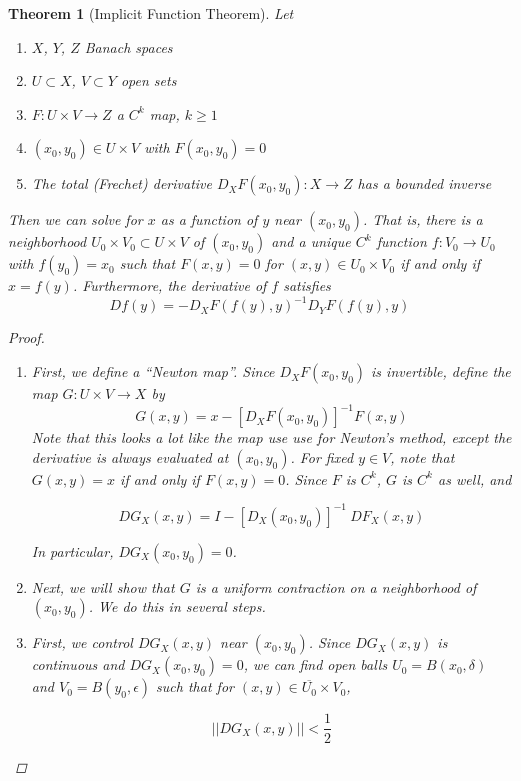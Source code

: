 \documentclass{article}
\newtheorem{theorem}{Theorem}[section]
\begin{document}
\begin{theorem}[Implicit Function Theorem]
Let
\begin{enumerate}
\item $X$, $Y$, $Z$ Banach spaces
\item $U \subset X$, $V \subset Y$ open sets
\item $F: U \times V \rightarrow Z$ a $C^k$ map, $k \geq 1$
\item $(x_0, y_0) \in U \times V$ with $F(x_0, y_0) = 0$
\item The total (Frechet) derivative $D_X F(x_0, y_0): X \rightarrow Z$ has a bounded inverse
\end{enumerate}
Then we can solve for $x$ as a function of $y$ near $(x_0, y_0)$. That is, there is a neighborhood $U_0 \times V_0 \subset U \times V$ of $(x_0, y_0)$ and a unique $C^k$ function $f: V_0 \rightarrow U_0$ with $f(y_0) = x_0$ such that $F(x, y) = 0$ for $(x, y) \in U_0 \times V_0$ if and only if $x = f(y)$. Furthermore, the derivative of $f$ satisfies
\[
Df(y) = -D_X F(f(y),y)^{-1} D_Y F(f(y),y)
\]

\begin{proof}
\begin{enumerate}
\item First, we define a ``Newton map''. Since $D_X F(x_0, y_0)$ is invertible, define the map $G: U \times V \rightarrow X$ by 
\begin{equation}\label{defG}
G(x, y) = x - [D_X F(x_0, y_0)]^{-1} F(x, y)
\end{equation}
Note that this looks a lot like the map use use for Newton's method, except the derivative is always evaluated at $(x_0, y_0)$. For fixed $y \in V$, note that $G(x, y) = x$ if and only if $F(x, y) = 0$. Since $F$ is $C^k$, $G$ is $C^k$ as well, and

\[
DG_X(x, y) = I - [D_X(x_0, y_0)]^{-1} \: DF_X(x, y)
\]

In particular, $DG_X(x_0, y_0) = 0$.

\item Next, we will show that $G$ is a uniform contraction on a neighborhood of $(x_0, y_0)$. We do this in several steps.

\item First, we control $DG_X(x, y)$ near $(x_0, y_0)$. Since $DG_X(x, y)$ is continuous and $DG_X(x_0, y_0) = 0$, we can find open balls $U_0 = B(x_0, \delta)$ and $V_0 = B(y_0, \epsilon)$ such that for $(x, y) \in \overline{U_0} \times V_0$,

\[
||DG_X(x, y)|| < \frac{1}{2} 
\]


\end{enumerate}
\end{proof}
\end{theorem}
\end{document}
